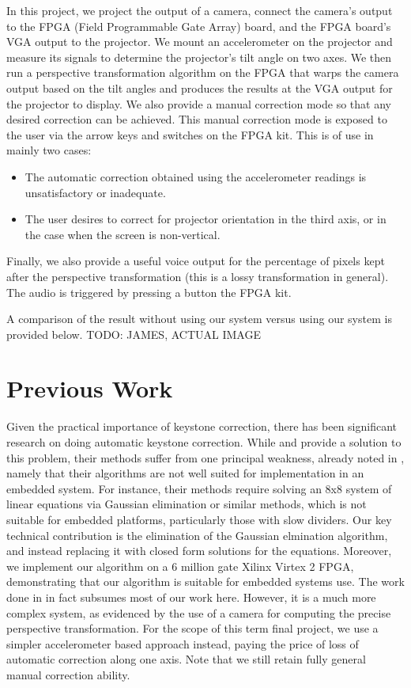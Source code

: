 \documentclass{article}
\begin{document}
In this project, we project the output of a camera, connect the camera's output to the FPGA (Field Programmable Gate Array) board,
and the FPGA board's VGA output to the projector.
We mount an accelerometer on the projector and measure its signals to determine the projector's tilt angle on two axes.
We then run a perspective transformation algorithm on the FPGA that warps the camera output based on the tilt angles and produces the results at the VGA output for the projector to display.
We also provide a manual correction mode so that any desired correction can be achieved.
This manual correction mode is exposed to the user via the arrow keys and switches on the FPGA kit.
This is of use in mainly two cases:
\begin{itemize}
\item The automatic correction obtained using the accelerometer readings is unsatisfactory or inadequate.
\item The user desires to correct for projector orientation in the third axis, or in the case when the screen is non-vertical.
\end{itemize}
Finally, we also provide a useful voice output for the percentage of pixels kept after the perspective transformation (this is a lossy transformation in general).
The audio is triggered by pressing a button the FPGA kit.

A comparison of the result without using our system versus using our system is provided below.
TODO: JAMES, ACTUAL IMAGE

\section{Previous Work}
Given the practical importance of keystone correction, there has been significant research on doing automatic keystone correction.
While \citet{raskar2001self} and \citet{sukthankar2001smarter} provide a solution to this problem, their methods suffer from one principal weakness,
already noted in \citet{baoxin2004automatic}, namely that their algorithms are not well suited for implementation in an embedded system.
For instance, their methods require solving an 8x8 system of linear equations via Gaussian elimination or similar methods,
which is not suitable for embedded platforms, particularly those with slow dividers.
Our key technical contribution is the elimination of the Gaussian elmination algorithm,
and instead replacing it with closed form solutions for the equations.
Moreover, we implement our algorithm on a 6 million gate Xilinx Virtex 2 FPGA, demonstrating that our algorithm is suitable for embedded systems use.
The work done in \citet{baoxin2004automatic} in fact subsumes most of our work here.
However, it is a much more complex system, as evidenced by the use of a camera for computing the precise perspective transformation.
For the scope of this term final project,
we use a simpler accelerometer based approach instead, paying the price of loss of automatic correction along one axis.
Note that we still retain fully general manual correction ability.
\end{document}

